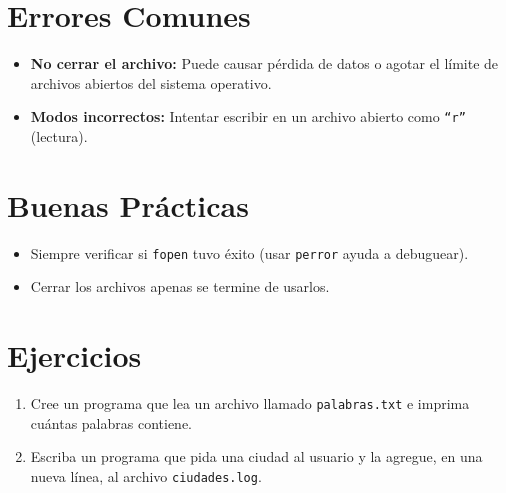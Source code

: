 \documentclass[12pt,a4paper]{article}
\begin{document}
\section{Errores Comunes}
\begin{itemize}
    \item \textbf{No cerrar el archivo:} Puede causar pérdida de datos o agotar el límite de archivos abiertos del sistema operativo.
    \item \textbf{Modos incorrectos:} Intentar escribir en un archivo abierto como \texttt{``r''} (lectura).
\end{itemize}

\section{Buenas Prácticas}
\begin{itemize}
    \item Siempre verificar si \texttt{fopen} tuvo éxito (usar \texttt{perror} ayuda a debuguear).
    \item Cerrar los archivos apenas se termine de usarlos.
\end{itemize}

\section{Ejercicios}
\begin{enumerate} 
    \item Cree un programa que lea un archivo llamado \texttt{palabras.txt} e imprima cuántas palabras contiene.
    \item Escriba un programa que pida una ciudad al usuario y la agregue, en una nueva línea, al archivo \texttt{ciudades.log}.
\end{enumerate}
\end{document}
